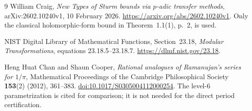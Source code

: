 \documentclass[11pt,a4paper]{article}
\theoremstyle{remark}
\begin{document}
\begin{thebibliography}{9}
William Craig,
\emph{New Types of Sturm bounds via $p$-adic transfer methods},
arXiv:2602.10240v1, 10 February 2026.
\url{https://arxiv.org/abs/2602.10240v1}.
Only the classical holomorphic-form bound in
Theorem~1.1(1), p.~2, is used.

NIST Digital Library of Mathematical Functions,
Section~23.18, \emph{Modular Transformations},
equations 23.18.5--23.18.7.
\url{https://dlmf.nist.gov/23.18}.

Heng Huat Chan and Shaun Cooper,
\emph{Rational analogues of Ramanujan's series for $1/\pi$},
Mathematical Proceedings of the Cambridge Philosophical Society
\textbf{153}(2) (2012), 361--383.
\href{https://doi.org/10.1017/S0305004112000254}{doi:10.1017/S0305004112000254}.
The level-$6$ parametrization is cited for comparison; it is not
needed for the direct period certification.
\end{thebibliography}
\endgroup
\end{document}
